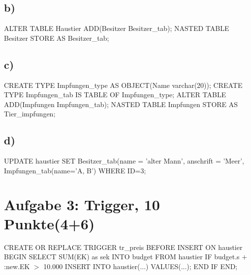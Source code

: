 \documentclass[12pt]{scrreprt}
\begin{document}
\subsection*{b)}
ALTER TABLE Haustier ADD(Besitzer Besitzer\_tab);\newline
NASTED TABLE Besitzer STORE AS Besitzer\_tab;
\subsection*{c)}
CREATE TYPE Impfungen\_type AS OBJECT(Name varchar(20));\newline
CREATE TYPE Impfungen\_tab IS TABLE OF Impfungen\_type;\newline
ALTER TABLE ADD(Impfungen Impfungen\_tab);\newline
NASTED TABLE Impfungen STORE AS Tier\_impfungen;
\subsection*{d)}
UPDATE haustier SET Besitzer\_tab(name = 'alter Mann', anschrift = 'Meer', Impfungen\_tab(name='A, B') WHERE ID=3;

\section*{Aufgabe 3: Trigger, 10 Punkte(4+6)}
CREATE OR REPLACE TRIGGER tr\_preis \newline
BEFORE INSERT ON haustier\newline
BEGIN\newline
\hspace*{5mm}SELECT SUM(EK) as sek INTO budget FROM haustier\newline
\hspace*{5mm}IF budget.s $+$ :new.EK $>$ 10.000\newline
\hspace*{10mm}INSERT INTO haustier(...) VALUES(...);\newline
\hspace*{5mm}END IF\newline
END;
\newpage
\end{document}
